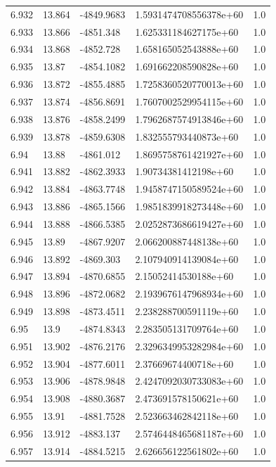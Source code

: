 \begin{tabular}{lllll}
6.932 & 13.864 & -4849.9683 & 1.5931474708556378e+60 & 1.0 \\
6.933 & 13.866 & -4851.348 & 1.625331184627175e+60 & 1.0 \\
6.934 & 13.868 & -4852.728 & 1.658165052543888e+60 & 1.0 \\
6.935 & 13.87 & -4854.1082 & 1.691662208590828e+60 & 1.0 \\
6.936 & 13.872 & -4855.4885 & 1.7258360520770013e+60 & 1.0 \\
6.937 & 13.874 & -4856.8691 & 1.7607002529954115e+60 & 1.0 \\
6.938 & 13.876 & -4858.2499 & 1.7962687574913846e+60 & 1.0 \\
6.939 & 13.878 & -4859.6308 & 1.832555793440873e+60 & 1.0 \\
6.94 & 13.88 & -4861.012 & 1.8695758761421927e+60 & 1.0 \\
6.941 & 13.882 & -4862.3933 & 1.90734381412198e+60 & 1.0 \\
6.942 & 13.884 & -4863.7748 & 1.9458747150589524e+60 & 1.0 \\
6.943 & 13.886 & -4865.1566 & 1.9851839918273448e+60 & 1.0 \\
6.944 & 13.888 & -4866.5385 & 2.0252873686619427e+60 & 1.0 \\
6.945 & 13.89 & -4867.9207 & 2.066200887448138e+60 & 1.0 \\
6.946 & 13.892 & -4869.303 & 2.107940914139084e+60 & 1.0 \\
6.947 & 13.894 & -4870.6855 & 2.15052414530188e+60 & 1.0 \\
6.948 & 13.896 & -4872.0682 & 2.1939676147968934e+60 & 1.0 \\
6.949 & 13.898 & -4873.4511 & 2.238288700591119e+60 & 1.0 \\
6.95 & 13.9 & -4874.8343 & 2.283505131709764e+60 & 1.0 \\
6.951 & 13.902 & -4876.2176 & 2.3296349953282984e+60 & 1.0 \\
6.952 & 13.904 & -4877.6011 & 2.37669674400718e+60 & 1.0 \\
6.953 & 13.906 & -4878.9848 & 2.4247092030733083e+60 & 1.0 \\
6.954 & 13.908 & -4880.3687 & 2.473691578150621e+60 & 1.0 \\
6.955 & 13.91 & -4881.7528 & 2.523663462842118e+60 & 1.0 \\
6.956 & 13.912 & -4883.137 & 2.5746448465681187e+60 & 1.0 \\
6.957 & 13.914 & -4884.5215 & 2.626656122561802e+60 & 1.0 \\

\end{tabular}
